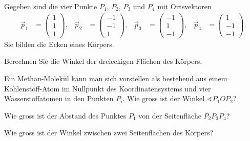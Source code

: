 Gegeben sind die vier Punkte 
$P_1$,
$P_2$,
$P_3$ und $P_4$
mit Ortsvektoren
\begin{align*}
\vec p_1&=\begin{pmatrix} 1\\ 1\\ 1\end{pmatrix},&
\vec p_2&=\begin{pmatrix}-1\\-1\\ 1\end{pmatrix},&
\vec p_3&=\begin{pmatrix}-1\\ 1\\-1\end{pmatrix},&
\vec p_4&=\begin{pmatrix} 1\\-1\\-1\end{pmatrix}.
\end{align*}
Sie bilden die Ecken eines Körpers.
\begin{teilaufgaben}
\item Berechnen Sie die Winkel der dreieckigen Flächen des Körpers.
\item Ein Methan-Molekül kann man sich vorstellen als bestehend aus
einem Kohlenstoff-Atom im Nullpunkt des Koordinatensystems und vier
Wasserstoffatomen in den Punkten $P_i$. Wie gross ist der Winkel
$\sphericalangle P_1 O P_2$?
\item Wie gross ist der Abstand des Punktes $P_1$ von der Seitenfläche
$P_2P_3P_4$?
\item Wie gross ist der Winkel zwischen zwei Seitenflächen des Körpers?
\end{teilaufgaben}


